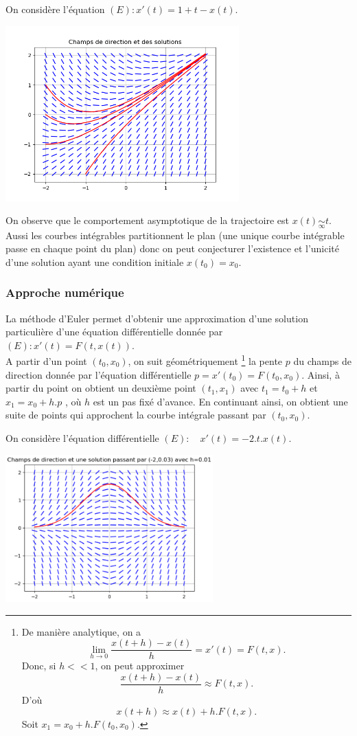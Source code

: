 \documentclass{book}
\begin{document}
\begin{Exemple} On considère l'équation $(E):x'(t)=1+t-x(t)$.\\
\begin{center}
\includegraphics[width=9cm]{C7_equation_differentielle_solution.png}
\end{center}
On observe que le comportement asymptotique de la trajectoire est $x(t)\underset{\infty}{\sim} t$. Aussi les courbes intégrables partitionnent le plan (une unique courbe intégrable passe en chaque point du plan) donc on peut conjecturer l'existence et l'unicité d'une solution ayant une condition initiale $x(t_0)=x_0$.
\end{Exemple}
\subsubsection{Approche  numérique}
La méthode d'Euler permet d'obtenir une approximation d'une solution particulière d'une équation différentielle donnée par $(E):x'(t)=F(t,x(t))$.\\
A partir d'un point $(t_0,x_0)$, on suit géométriquement \footnote{De manière analytique, on a $$ \lim_{h\to 0}\frac{x(t+h)-x(t)}{h}=x'(t)=F(t,x).$$ Donc, si $h<<1$, on peut approximer 
$$ \frac{x(t+h)-x(t)}{h}\approx F(t,x).$$D'où $$ x(t+h)\approx x(t) +  h.F(t,x).$$ Soit $x_1=x_0+h.F(t_0,x_0)$.} la pente $p$ du champs de direction donnée par l'équation différentielle $p=x'(t_0)=F(t_0,x_0)$.
Ainsi, à partir du point on obtient un deuxième point $(t_1,x_1)$ avec $t_1=t_0+h$ et $x_1=x_0+h.p$ , où $h$ est un pas fixé d'avance.
En continuant ainsi, on obtient une suite de points qui approchent la courbe intégrale passant par  $(t_0,x_0)$.
\begin{Exemple}[Bosse]  On considère l'équation différentielle $(E):\quad x'(t) = -2.t.x(t)$. 
\begin{center}
\includegraphics[width=8cm]{C7_equation_differentielle_bosse.png}
\end{center}
\end{Exemple}
\end{document}
